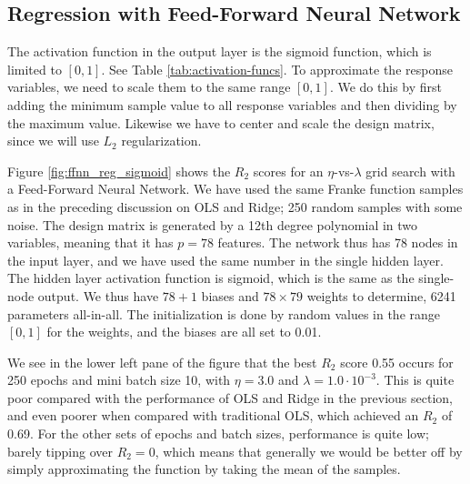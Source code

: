 \documentclass[]{article}
\begin{document}
\subsection{Regression with Feed-Forward Neural Network}



The activation function in the output layer is the sigmoid function, which is limited to $[0,1]$. See Table \ref{tab:activation-funcs}. To approximate the response variables, we need to scale them to the same range $[0,1]$. We do this by first adding the minimum sample value to all response variables and then dividing by the maximum value. Likewise we have to center and scale the design matrix, since we will use $L_2$ regularization.

Figure \ref{fig:ffnn_reg_sigmoid} shows the $R_2$ scores for an $\eta$-vs-$\lambda$ grid search with a Feed-Forward Neural Network. We have used the same Franke function samples as in the preceding discussion on OLS and Ridge; 250 random samples with some noise. The design matrix is generated by a 12th degree polynomial in two variables, meaning that it has $p = 78$ features. The network thus has 78 nodes in the input layer, and we have used the same number in the single hidden layer. The hidden layer activation function is sigmoid, which is the same as the single-node output. We thus have $78+1$ biases and $78 \times 79$ weights to determine, 6241 parameters all-in-all. The initialization is done by random values in the range $[0,1]$ for the weights, and the biases are all set to 0.01.

We see in the lower left pane of the figure that the best $R_2$ score 0.55 occurs for 250 epochs and mini batch size 10, with $\eta = 3.0$ and $\lambda = 1.0 \cdot 10^{-3}$. This is quite poor compared with the performance of OLS and Ridge in the previous section, and even poorer when compared with traditional OLS, which achieved an $R_2$ of 0.69. For the other sets of epochs and batch sizes, performance is quite low; barely tipping over $R_2 = 0$, which means that generally we would be better off by simply approximating the function by taking the mean of the samples.
\end{document}
